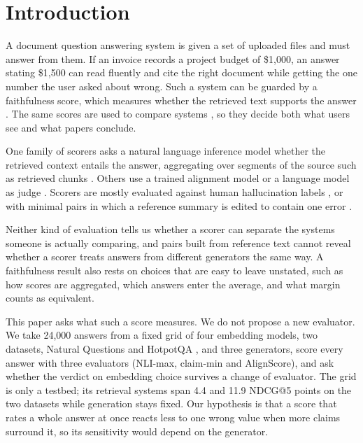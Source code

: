 \documentclass[11pt]{article}
\begin{document}
\section{Introduction}
\label{sec:intro}
 
A document question answering system is given a set of uploaded files and must answer from them. If an invoice records a project budget of \$1,000, an answer stating \$1,500 can read fluently and cite the right document while getting the one number the user asked about wrong. Such a system can be guarded by a faithfulness score, which measures whether the retrieved text supports the answer \citep{maynez-etal-2020}. The same scores are used to compare systems \citep{es-etal-2024,tamber-etal-2025}, so they decide both what users see and what papers conclude.
 
One family of scorers asks a natural language inference model whether the retrieved context entails the answer, aggregating over segments of the source such as retrieved chunks \citep{laban-etal-2022-summac}. Others use a trained alignment model \citep[AlignScore;][]{zha-etal-2023} or a language model as judge \citep{saad-falcon-etal-2024,tamber-etal-2025}. Scorers are mostly evaluated against human hallucination labels \citep{honovich-etal-2022,tang-etal-2023,niu-etal-2024,bao-etal-2025}, or with minimal pairs in which a reference summary is edited to contain one error \citep{ma-etal-2023}.
 
Neither kind of evaluation tells us whether a scorer can separate the systems someone is actually comparing, and pairs built from reference text cannot reveal whether a scorer treats answers from different generators the same way. A faithfulness result also rests on choices that are easy to leave unstated, such as how scores are aggregated, which answers enter the average, and what margin counts as equivalent.
 
This paper asks what such a score measures. We do not propose a new evaluator. We take 24,000 answers from a fixed grid of four embedding models, two datasets, Natural Questions \citep[NQ;][]{kwiatkowski-etal-2019} and HotpotQA \citep{yang-etal-2018}, and three generators, score every answer with three evaluators (NLI-max, claim-min and AlignScore), and ask whether the verdict on embedding choice survives a change of evaluator. The grid is only a testbed; its retrieval systems span 4.4 and 11.9 NDCG@5 points on the two datasets while generation stays fixed. Our hypothesis is that a score that rates a whole answer at once reacts less to one wrong value when more claims surround it, so its sensitivity would depend on the generator.
 
\end{document}
